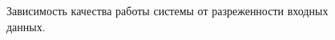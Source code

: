 \documentclass[a4paper, 12pt]{article} %
\begin{document}
	\begin{figure}[h]
	\begin{minipage}[h]{0.49\linewidth}
	\end{minipage}
	\hfill
	\begin{minipage}[h]{0.49\linewidth}
	\end{minipage}
	\caption{Зависимость качества работы системы от разреженности входных данных.}
	\label{fig:accuracy}
	\end{figure}
	
\end{document}
